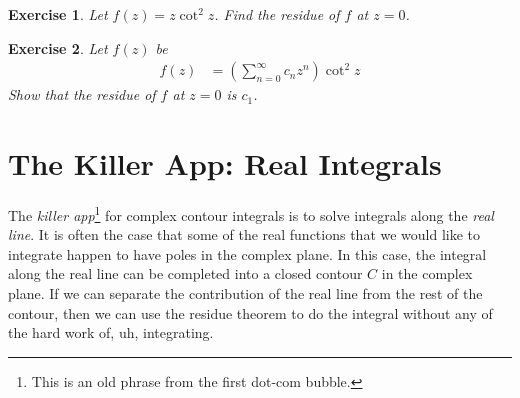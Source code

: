 \documentclass[
  11pt,
	colorful,
	raggedright,
]{tufte-style-thesis-flip}
\newtheorem{exercise}{Exercise}[section]
\begin{document}
\begin{exercise}
Let $f(z)=z\cot^2 z$. Find the residue of $f$ at $z=0$. 
\end{exercise}


\begin{exercise}
Let $f(z)$ be
\begin{align}
  f(z) &= \left(\sum_{n=0}^\infty c_n z^n\right)\cot^2 z
\end{align}
Show that the residue of $f$ at $z=0$ is $c_1$.
\end{exercise}



\section{The Killer App: Real Integrals}

The \emph{killer app}\footnote{This is an old phrase from the first dot-com bubble.} for complex contour integrals is to solve integrals along the \emph{real line}. It is often the case that some of the real functions that we would like to integrate happen to have poles in the complex plane. In this case, the integral along the real line can be completed into a closed contour $C$ in the complex plane. If we can separate the contribution of the real line from the rest of the contour, then we can use the residue theorem to do the integral without any of the hard work of, uh, integrating.
\end{document}
